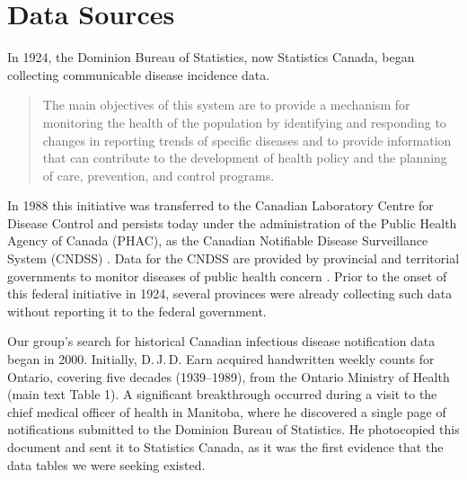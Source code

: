 \documentclass[12pt]{article}
\begin{document}

\newpage


\renewcommand{\thefigure}{\Alph{figure}}
\renewcommand{\thesection}{\Alph{section}}



\newpage

\tableofcontents

\newpage

\section{Data Sources}\label{sec:appendix-data-sources}

In 1924, the Dominion Bureau of Statistics, now Statistics Canada, began collecting communicable disease incidence data.

\begin{quote}
The main objectives of this system are to provide a mechanism for monitoring the health of the population by identifying and responding to changes in reporting trends of specific diseases and to provide information that can contribute to the development of health policy and the planning of care, prevention, and control programs. \cite{sockett1996communicable}
\end{quote}

\noindent In 1988 this initiative was transferred to the Canadian Laboratory Centre for Disease Control and persists today under the administration of the Public Health Agency of Canada (PHAC), as the Canadian Notifiable Disease Surveillance System (CNDSS) \cite{totten2019updates}. Data for the CNDSS are provided by provincial and territorial governments to monitor diseases of public health concern \cite{totten2019updates}. Prior to the onset of this federal initiative in 1924, several provinces were already collecting such data without reporting it to the federal government.

Our group's search for historical Canadian infectious disease notification data began in 2000. Initially, D.\,J.\,D. Earn acquired handwritten weekly counts for Ontario, covering five decades (1939--1989), from the Ontario Ministry of Health (main text Table 1). A significant breakthrough occurred during a visit to the chief medical officer of health in Manitoba, where he discovered a single page of notifications submitted to the Dominion Bureau of Statistics. He photocopied this document and sent it to Statistics Canada, as it was the first evidence that the data tables we were seeking existed.
\end{document}
